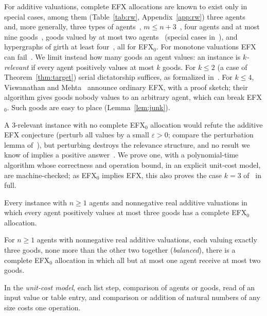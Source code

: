\documentclass[runningheads,11pt]{llncs}
\newcommand{\efxz}{\texorpdfstring{\mbox{EFX$_0$}}{EFX0}}
\begin{document}
For additive valuations, complete EFX allocations are known to exist only in special cases, among them (Table~\ref{tab:rw}, Appendix~\ref{app:rw}) three agents~\cite{ChaudhuryGM20} and, more generally, three types of agents~\cite{HVGNV25}, $m\le n+3$~\cite{Mahara21}, four agents and at most nine goods~\cite{AlkassarFM26}, goods valued by at most two agents~\cite{AfshinmehrAMMS26} (special cases in~\cite{ChristodoulouFKS23,SgouritsaS25,KavianiSS24}), and hypergraphs of girth at least four~\cite{LianeasSS26}, all for \efxz{}. For monotone valuations EFX can fail~\cite{AkramiMMSW26,MackenzieS26}. We limit instead how many goods an agent values: an instance is \emph{$k$-relevant} if every agent positively values at most $k$ goods. For $k\le2$ (a case of Theorem~\ref{thm:target}) serial dictatorship suffices, as formalized in~\cite{MrdEfx}. For $k\le4$, Viswanathan and Mehta~\cite{ViswanathanM24} announce ordinary EFX, with a proof sketch; their algorithm gives goods nobody values to an arbitrary agent, which can break \efxz{}. Such goods are easy to place (Lemma~\ref{lem:junk}).

A $3$-relevant instance with no complete \efxz{} allocation would refute the additive EFX conjecture (perturb all values by a small $\varepsilon>0$; compare the perturbation lemma of~\cite{ChaudhuryGM20}), but perturbing destroys the relevance structure, and no result we know of implies a positive answer~\cite{Repo}. We prove one, with a polynomial-time algorithm whose correctness and operation bound, in an explicit unit-cost model, are machine-checked; as \efxz{} implies EFX, this also proves the case $k=3$ of~\cite{ViswanathanM24} in full.

\begin{theorem}[existence]\label{thm:target}
Every instance with $n\ge1$ agents and nonnegative real additive valuations in which every agent positively values at most three goods has a complete \efxz{} allocation.
\end{theorem}

\begin{theorem}\label{thm:D}
For $n\ge1$ agents with nonnegative real additive valuations, each valuing exactly three goods, none more than the other two together (\emph{balanced}), there is a complete \efxz{} allocation in which all but at most one agent receive at most two goods.
\end{theorem}

\noindent In the \emph{unit-cost model}, each list step, comparison of agents or goods, read of an input value or table entry, and comparison or addition of natural numbers of any size costs one operation.
\end{document}
